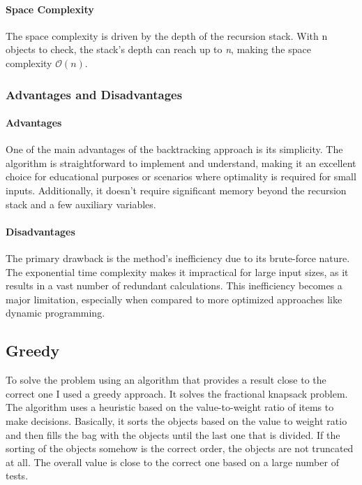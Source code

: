 \documentclass[runningheads]{llncs}
\begin{document}
\paragraph{Space Complexity}
The space complexity is driven by the depth of the recursion stack. With n objects to check, the 
stack's depth can reach up to \textit{n}, making the space complexity $\mathcal{O}(n)$.

\subsubsection{Advantages and Disadvantages}
\paragraph{Advantages}
One of the main advantages of the backtracking approach is its simplicity. The algorithm is
straightforward to implement and understand, making it an excellent choice for educational purposes
or scenarios where optimality is required for small inputs. Additionally, it doesn't require 
significant memory beyond the recursion stack and a few auxiliary variables.

\paragraph{Disadvantages}
The primary drawback is the method's inefficiency due to its brute-force nature. The exponential 
time complexity makes it impractical for large input sizes, as it results in a vast number of
redundant calculations. This inefficiency becomes a major limitation, especially when compared to
more optimized approaches like dynamic programming.


\subsection{Greedy}

To solve the problem using an algorithm that provides a result close to the correct one I used a
greedy approach. It solves the fractional knapsack problem. The algorithm uses a heuristic based on
the value-to-weight ratio of items to make decisions. Basically, it sorts the objects based on the
value to weight ratio and then fills the bag with the objects until the last one that is divided.
If the sorting of the objects somehow is the correct order, the objects are not truncated at all.
The overall value is close to the correct one based on a large number of tests.
\end{document}
